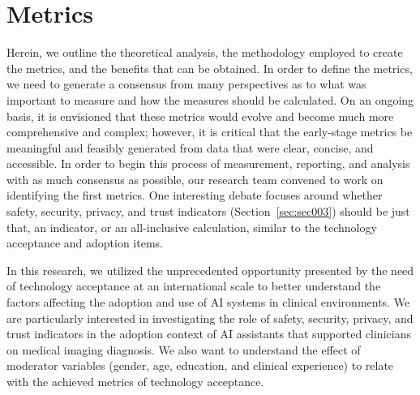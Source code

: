 
\section{Metrics}
\label{sec:sec008}

Herein, we outline the theoretical analysis, the methodology employed to create the metrics, and the benefits that can be obtained.
In order to define the metrics, we need to generate a consensus from many perspectives as to what was important to measure and how the measures should be calculated.
On an ongoing basis, it is envisioned that these metrics would evolve and become much more comprehensive and complex; however, it is critical that the early-stage metrics be meaningful and feasibly generated from data that were clear, concise, and accessible.
In order to begin this process of measurement, reporting, and analysis with as much consensus as possible, our research team convened to work on identifying the first metrics.
One interesting debate focuses around whether safety, security, privacy, and trust indicators (Section~\ref{sec:sec003}) should be just that, an indicator, or an all-inclusive calculation, similar to the technology acceptance and adoption items.

In this research, we utilized the unprecedented opportunity presented by the need of technology acceptance at an international scale to better understand the factors affecting the adoption and use of AI systems in clinical environments.
We are particularly interested in investigating the role of safety, security, privacy, and trust indicators in the adoption context of AI assistants that supported clinicians on medical imaging diagnosis.
We also want to understand the effect of moderator variables (gender, age, education, and clinical experience) to relate with the achieved metrics of technology acceptance.

